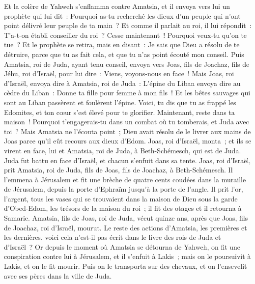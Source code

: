 \begin{multicols}{2}
Et la colère de Yahweh s'enflamma contre Amatsia, et il envoya vers lui un prophète qui lui dit~: Pourquoi as-tu recherché les dieux d'un peuple qui n'ont point délivré leur peuple de ta main~?
Et comme il parlait au roi, il lui répondit~: T'a-t-on établi conseiller du roi~? Cesse maintenant~! Pourquoi veux-tu qu'on te tue~? Et le prophète se retira, mais en disant~: Je sais que Dieu a résolu de te détruire, parce que tu as fait cela, et que tu n'as point écouté mon conseil.
Puis Amatsia, roi de Juda, ayant tenu conseil, envoya vers Joas, fils de Joachaz, fils de Jéhu, roi d'Israël, pour lui dire~: Viens, voyons-nous en face~!
Mais Joas, roi d'Israël, envoya dire à Amatsia, roi de Juda~: L'épine du Liban envoya dire au cèdre du Liban~: Donne ta fille pour femme à mon fils~! Et les bêtes sauvages qui sont au Liban passèrent et foulèrent l'épine.
Voici, tu dis que tu as frappé les Edomites, et ton cœur s'est élevé pour te glorifier. Maintenant, reste dans ta maison~! Pourquoi t'engagerais-tu dans un combat où tu tomberais, et Juda avec toi~?
Mais Amatsia ne l'écouta point~; Dieu avait résolu de le livrer aux mains de Joas parce qu'il eût recours aux dieux d'Edom.
Joas, roi d'Israël, monta~; et ils se virent en face, lui et Amatsia, roi de Juda, à Beth-Schémesch, qui est de Juda.
Juda fut battu en face d'Israël, et chacun s'enfuit dans sa tente.
Joas, roi d'Israël, prit Amatsia, roi de Juda, fils de Joas, fils de Joachaz, à Beth-Schémesch. Il l'emmena à Jérusalem et fit une brèche de quatre cents coudées dans la muraille de Jérusalem, depuis la porte d'Ephraïm jusqu'à la porte de l'angle.
Il prit l'or, l'argent, tous les vases qui se trouvaient dans la maison de Dieu sous la garde d'Obed-Edom, les trésors de la maison du roi~; il fit des otages et il retourna à Samarie.
Amatsia, fils de Joas, roi de Juda, vécut quinze ans, après que Joas, fils de Joachaz, roi d'Israël, mourut.
Le reste des actions d'Amatsia, les premières et les dernières, voici cela n'est-il pas écrit dans le livre des rois de Juda et d'Israël~?
Or depuis le moment où Amatsia se détourna de Yahweh, on fit une conspiration contre lui à Jérusalem, et il s'enfuit à Lakis~; mais on le poursuivit à Lakis, et on le fit mourir.
Puis on le transporta sur des chevaux, et on l'ensevelit avec ses pères dans la ville de Juda.

\end{multicols}
